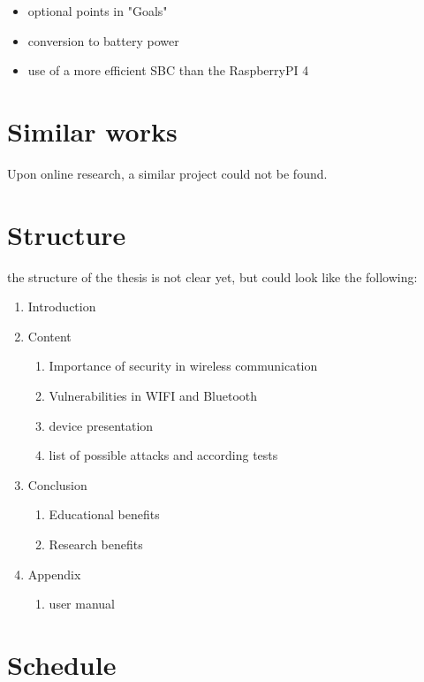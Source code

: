 \documentclass{article}
\begin{document}
    \begin{itemize}
        \item optional points in "Goals"
        \item conversion to battery power
        \item use of a more efficient SBC than the RaspberryPI 4
    \end{itemize}

\section{Similar works}
Upon online research, a similar project could not be found.


\section{Structure}

the structure of the thesis is not clear yet, but could look like the following:

\begin{enumerate}
    \item Introduction
    \item Content
    \begin{enumerate}
        \item Importance of security in wireless communication
        \item Vulnerabilities in WIFI and Bluetooth
        \item device presentation
        \item list of possible attacks and according tests
    \end{enumerate}
    \item Conclusion
    \begin{enumerate}
        \item Educational benefits
        \item Research benefits
    \end{enumerate}
    \item Appendix
    \begin{enumerate}
        \item user manual
    \end{enumerate}
\end{enumerate}

\section{Schedule}
\end{document}
